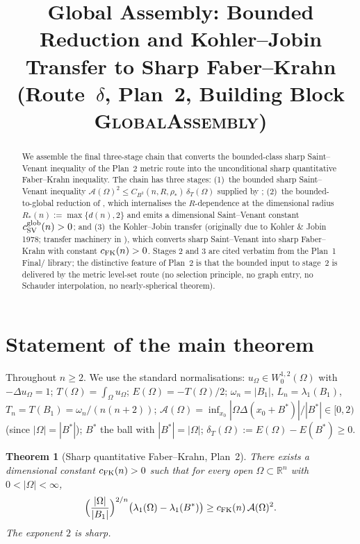 \documentclass[11pt]{article}
\title{Global Assembly: Bounded Reduction and Kohler--Jobin\\
       Transfer to Sharp Faber--Krahn\\
       (Route~$\delta$, Plan~2, Building Block \textsc{GlobalAssembly})}
\author{}
\date{}
\newtheorem{theorem}{Theorem}[section]
\theoremstyle{definition}
\newcommand{\R}{\mathbb{R}}
\newcommand{\Fr}{\mathcal{A}}
\newcommand{\Om}{\Omega}
\newcommand{\rstar}{\rho_{*}}
\newcommand{\Bstar}{B^{*}}
\begin{document}
\maketitle

\begin{abstract}
We assemble the final three-stage chain that converts the bounded-class
sharp Saint--Venant inequality of the Plan~2 metric route into the
unconditional sharp quantitative Faber--Krahn inequality. The chain has
three stages: (1)~the bounded sharp Saint--Venant inequality
$\Fr(\Om)^{2}\le C_{B^2}(n,R,\rstar)\,\delta_{T}(\Om)$ supplied by
\cite{BoundaryLayerTransfer}; (2)~the bounded-to-global reduction of
\cite[Lemmas~5.1--5.3]{BDV-BoundedReduction-Plan1}, which internalises the
$R$-dependence at the dimensional radius $R_*(n):=\max\{d(n),2\}$ and
emits a dimensional Saint--Venant constant $c_{\rm SV}^{\rm glob}(n)>0$;
and (3)~the Kohler--Jobin transfer (originally due to Kohler \& Jobin
1978; transfer machinery in \cite{KohlerJobinTransfer-Plan1}), which
converts sharp Saint--Venant into sharp Faber--Krahn with constant
$c_{\rm FK}(n)>0$. Stages 2 and 3 are cited verbatim from the Plan~1
Final/ library; the distinctive feature of Plan~2 is that the bounded
input to stage~2 is delivered by the metric level-set route (no
selection principle, no graph entry, no Schauder interpolation, no
nearly-spherical theorem).
\end{abstract}

\section{Statement of the main theorem}\label{sec:statement}

Throughout $n\ge 2$. We use the standard normalisations:
$u_\Om\in W^{1,2}_0(\Om)$ with $-\Delta u_\Om=1$;
$T(\Om)=\int_\Om u_\Om$; $E(\Om)=-T(\Om)/2$;
$\omega_n=|B_1|$, $L_n=\lambda_1(B_1)$, $T_n=T(B_1)=\omega_n/(n(n+2))$;
$\Fr(\Om)=\inf_{x_0}|\Om\Delta(x_0+\Bstar)|/|\Bstar|\in[0,2)$ (since $|\Om|=|\Bstar|$);
$\Bstar$ the ball with $|\Bstar|=|\Om|$;
$\delta_T(\Om):=E(\Om)-E(\Bstar)\ge 0$.

\begin{theorem}[Sharp quantitative Faber--Krahn, Plan~2]\label{thm:FK}
There exists a dimensional constant $c_{\rm FK}(n)>0$ such that for
every open $\Om\subset\R^n$ with $0<|\Om|<\infty$,
\begin{equation}\label{eq:FK-main}
   \Bigl(\frac{|\Om|}{|B_1|}\Bigr)^{2/n}
   \bigl(\lambda_1(\Om)-\lambda_1(\Bstar)\bigr)
   \ge c_{\rm FK}(n)\,\Fr(\Om)^2.
\end{equation}
The exponent $2$ is sharp.
\end{theorem}
\end{document}
